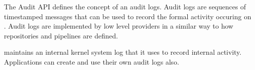 The Audit API defines the concept of an audit logs. Audit logs are sequences of timestamped messages that can
be used to record the formal activity occuring on \Rapture. Audit logs are implemented by low level providers in a
similar way to how repositories and pipelines are defined.

\Rapture maintains an internal kernel system log that it uses to record internal activity. Applications can create and
use their own audit logs also.
